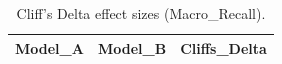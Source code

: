 \begin{table}[t]
\centering
\begin{tabular}{lll}
\toprule
Model_A & Model_B & Cliffs_Delta \\
\midrule
\bottomrule
\end{tabular}
\caption{Cliff's Delta effect sizes (Macro_Recall).}
\label{tab:cliffs_Macro_Recall}
\end{table}